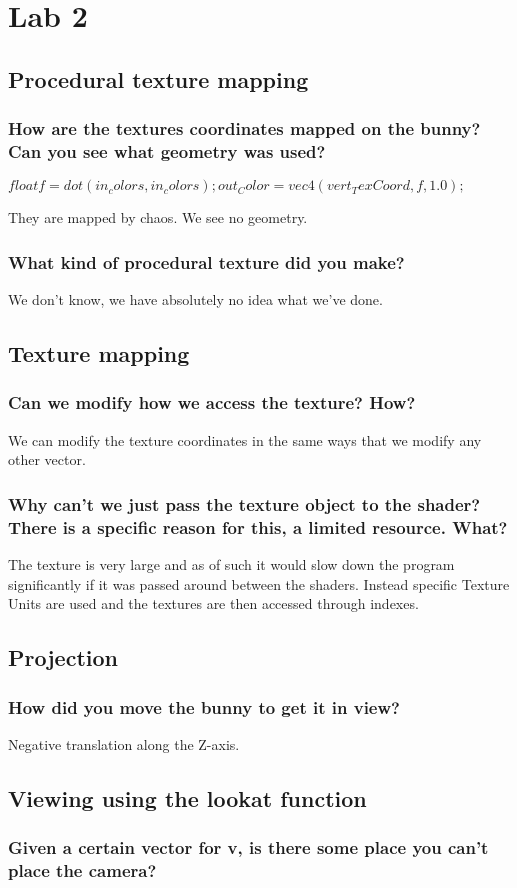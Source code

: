\documentclass[a4paper,12pt]{article}
\begin{document}
\section{Lab 2}
\subsection{Procedural texture mapping}
\subsubsection{How are the textures coordinates mapped on the bunny? Can you see what geometry was used?}
$
  float f = dot(in_colors, in_colors);
  out_Color = vec4(vert_TexCoord, f, 1.0);
$

They are mapped by chaos. We see no geometry.

\subsubsection{What kind of procedural texture did you make?}
We don't know, we have absolutely no idea what we've done.


\subsection{Texture mapping}
\subsubsection{Can we modify how we access the texture? How?}
We can modify the texture coordinates in the same ways that we modify any other vector.

\subsubsection{Why can't we just pass the texture object to the shader? There is a specific reason for this, a limited resource. What?}
The texture is very large and as of such it would slow down the program significantly if it was passed around between the shaders. Instead specific Texture Units are used and the textures are then accessed through indexes.

\subsection{Projection}
\subsubsection{How did you move the bunny to get it in view?}
Negative translation along the Z-axis.

\subsection{Viewing using the lookat function}
\subsubsection{Given a certain vector for v, is there some place you can't place the camera?}
\end{document}
